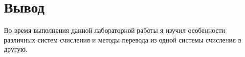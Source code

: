 \section{Вывод}
Во время выполнения данной лабораторной работы я изучил особенности различных систем счисления и методы перевода из одной системы счисления в другую.
